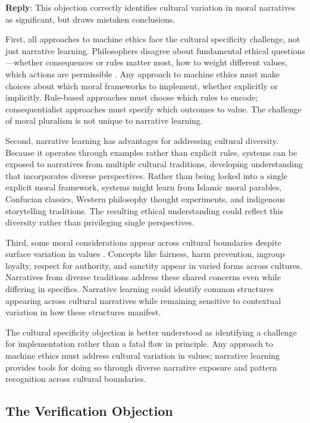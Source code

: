 \documentclass[12pt]{article}
\begin{document}
\textbf{Reply}: This objection correctly identifies cultural variation in moral narratives as significant, but draws mistaken conclusions.

First, all approaches to machine ethics face the cultural specificity challenge, not just narrative learning. Philosophers disagree about fundamental ethical questions—whether consequences or rules matter most, how to weight different values, which actions are permissible \citep{beauchamp2001principles}. Any approach to machine ethics must make choices about which moral frameworks to implement, whether explicitly or implicitly. Rule-based approaches must choose which rules to encode; consequentialist approaches must specify which outcomes to value. The challenge of moral pluralism is not unique to narrative learning.

Second, narrative learning has advantages for addressing cultural diversity. Because it operates through examples rather than explicit rules, systems can be exposed to narratives from multiple cultural traditions, developing understanding that incorporates diverse perspectives. Rather than being locked into a single explicit moral framework, systems might learn from Islamic moral parables, Confucian classics, Western philosophy thought experiments, and indigenous storytelling traditions. The resulting ethical understanding could reflect this diversity rather than privileging single perspectives.

Third, some moral considerations appear across cultural boundaries despite surface variation in values \citep{brown1991human, haidt2012righteous}. Concepts like fairness, harm prevention, ingroup loyalty, respect for authority, and sanctity appear in varied forms across cultures. Narratives from diverse traditions address these shared concerns even while differing in specifics. Narrative learning could identify common structures appearing across cultural narratives while remaining sensitive to contextual variation in how these structures manifest.

The cultural specificity objection is better understood as identifying a challenge for implementation rather than a fatal flaw in principle. Any approach to machine ethics must address cultural variation in values; narrative learning provides tools for doing so through diverse narrative exposure and pattern recognition across cultural boundaries.

\subsection{The Verification Objection}
\end{document}
